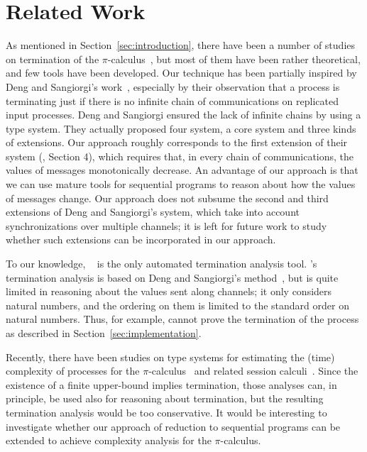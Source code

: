 \section{Related Work}  \label{sec:relatedwork}

As mentioned in Section~\ref{sec:introduction}, there have been a number of
studies on termination of the \(\pi\)-calculus~\cite{Deng06IC,Demangeon07,SangiorgiTermination,KobayashiHybrid,Yoshida04IC,DBLP:journals/jlp/DemangeonHS10,Venet98SAS},
but most of them have been rather theoretical, and few tools have been developed.
Our technique has been partially inspired by Deng and Sangiorgi's work~\cite{Deng06IC}, especially by their observation that a process is terminating just if
there is no infinite chain of communications on replicated input processes.
Deng and Sangiorgi ensured the lack of infinite chains by using a type system.
They actually proposed four system, a core system and three kinds of extensions.
Our approach roughly corresponds to the first extension of their system (\cite{Deng06IC}, Section 4), which requires that, in every
chain of communications, the values of messages
monotonically decrease. An advantage of our approach is that we can use mature tools
for sequential programs to reason about how the values of messages change.
Our approach does not subsume the second and third extensions of Deng and Sangiorgi's
system, which take into account synchronizations over multiple channels; it is
left for future work to study whether such extensions can be incorporated in
our approach.

To our knowledge,
\typical{}~\cite{TyPiCal,KobayashiHybrid}
is the only automated termination analysis tool.
\typical{}'s termination analysis is based on Deng and Sangiorgi's
method~\cite{Deng06IC}, but is quite limited in reasoning about
the values sent along channels; it only considers natural numbers, and
the ordering on them is limited to the standard order on natural numbers.
Thus, for example, \typical{} cannot prove the termination of the process 
as described in Section~\ref{sec:implementation}.

Recently, there have been studies on type systems for estimating
the (time) complexity of processes for the
\(\pi\)-calculus~\cite{DBLP:conf/esop/BaillotG21,DBLP:conf/concur/BaillotG021} and related session
calculi~\cite{DBLP:conf/lics/Das0P18,DBLP:journals/pacmpl/Das0P18}.
Since the existence of a finite upper-bound implies termination, those analyses
can, in principle, be used also for reasoning about termination, but the resulting
termination analysis would be too conservative.
It would be interesting to investigate whether our approach of reduction to 
sequential programs can be extended to achieve complexity analysis for the
\(\pi\)-calculus.

